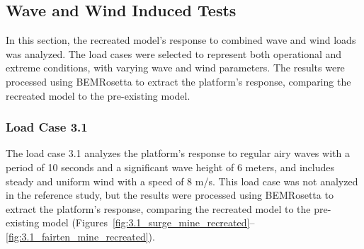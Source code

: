 \documentclass[a4paper, 11pt]{article}
\begin{document}
\subsection{Wave and Wind Induced Tests}
\hspace*{0.5cm}In this section, the recreated model's response to combined wave and wind loads was analyzed. The load cases were selected to represent both operational and extreme conditions, with varying wave and wind parameters. The results were processed using BEMRosetta to extract the platform's response, comparing the recreated model to the pre-existing model.

\subsubsection{Load Case 3.1}
\hspace*{0.5cm}The load case 3.1 analyzes the platform's response to regular airy waves with a period of 10 seconds and a significant wave height of 6 meters, and includes steady and uniform wind with a speed of 8 m/s. This load case was not analyzed in the reference study, but the results were processed using BEMRosetta to extract the platform's response, comparing the recreated model to the pre-existing model (Figures~\ref{fig:3.1_surge_mine_recreated}--\ref{fig:3.1_fairten_mine_recreated}).
\end{document}
